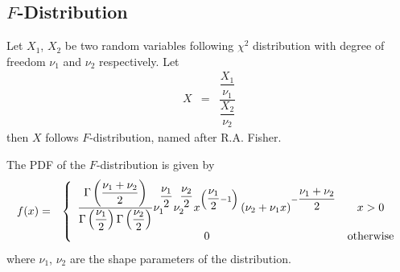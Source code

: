 \subsection{$F$-Distribution}

Let $X_1$, $X_2$ be two random variables following $\chi^2$ distribution with degree of freedom $\nu_1$ and $\nu_2$ respectively. Let
\begin{eqnarray}
	X &=& \dfrac{\dfrac{X_1}{\nu_1}}{\dfrac{X_2}{\nu_2}} \nonumber
\end{eqnarray}
then $X$ follows $F$-distribution, named after R.A. Fisher.

The PDF of the $F$-distribution is given by
\begin{eqnarray}
	f(x) &=& \left\{\begin{array}{cc}
		\dfrac{\Gamma\left(\dfrac{\nu_1+\nu_2}{2}\right)}{\Gamma\left(\dfrac{\nu_1}{2}\right)\Gamma\left(\dfrac{\nu_2}{2}\right)}\nu_1^{\dfrac{\nu_1}{2}}\nu_2^{\dfrac{\nu_2}{2}}x^{\left(\dfrac{\nu_1}{2}-1\right)}\left(\nu_2+\nu_1 x\right)^{-\dfrac{\nu_1+\nu_2}{2}} & x > 0 \\
		0 & \textup{otherwise}
	\end{array}\right. \nonumber
\end{eqnarray}
where $\nu_1$, $\nu_2$ are the shape parameters of the distribution. 